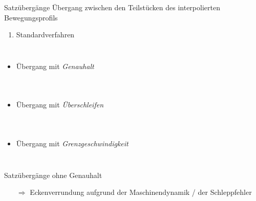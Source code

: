\begin{frame}{Satzübergänge}
%
Übergang zwischen den Teilstücken des interpolierten Bewegungsprofils
%
\begin{enumerate}
  \item Standardverfahren
\end{enumerate}
%
\begin{columns}[T]
%
%
%
\begin{itemize}
  \item Übergang mit {\em Genauhalt}
\end{itemize}
%

%
\end{columns}
%
\vspace{12pt}
%
\begin{columns}[T]
%
%
%
\begin{itemize}
  \item Übergang mit {\em Überschleifen}
\end{itemize}
%

%
\end{columns}
%
\vspace{12pt}
%
\begin{columns}[T]
%
%
%
\begin{itemize}
  \item Übergang mit {\em Grenzgeschwindigkeit}
\end{itemize}
%

%
\end{columns}
%

\vspace{6pt}

Satzübergänge ohne Genauhalt
%
\begin{itemize}
  \item[$\Rightarrow$] Eckenverrundung aufgrund der Maschinendynamik / der
  Schleppfehler
\end{itemize} 
%
\end{frame}
%
%
%
